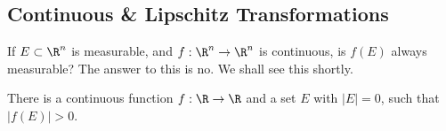 











\subsection{Continuous \& Lipschitz Transformations}

If $E \subset \R^n$ is measurable, and $f: \R^n \to \R^n$ is continuous, is $f(E)$ always measurable? The answer to this is no. We shall see this shortly. 


\begin{lem} \label{lem:rcontfun}
There is a continuous function $f: \R \to \R$ and a set $E$ with $|E|=0$, such that $|f(E)|>0$.
\end{lem}

\pfsk 







